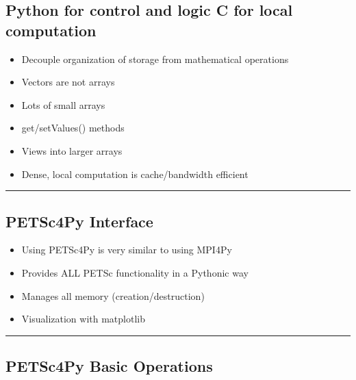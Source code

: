 \documentclass{article}
\begin{document}
\subsection{Python for control and logic C for local
computation}\label{python-for-control-and-logic-c-for-local-computation}

\begin{itemize}
\itemsep1pt\parskip0pt
\item
  Decouple organization of storage from mathematical operations
\item
  Vectors are not arrays
\item
  Lots of small arrays
\item
  get/setValues() methods
\item
  Views into larger arrays
\item
  Dense, local computation is cache/bandwidth efficient
\end{itemize}

    \begin{center}\rule{3in}{0.4pt}\end{center}

\subsection{PETSc4Py Interface}\label{petsc4py-interface}

\begin{itemize}
\itemsep1pt\parskip0pt
\item
  Using PETSc4Py is very similar to using MPI4Py
\item
  Provides ALL PETSc functionality in a Pythonic way
\item
  Manages all memory (creation/destruction)
\item
  Visualization with matplotlib
\end{itemize}

    \begin{center}\rule{3in}{0.4pt}\end{center}

\subsection{PETSc4Py Basic Operations}\label{petsc4py-basic-operations}
\end{document}
